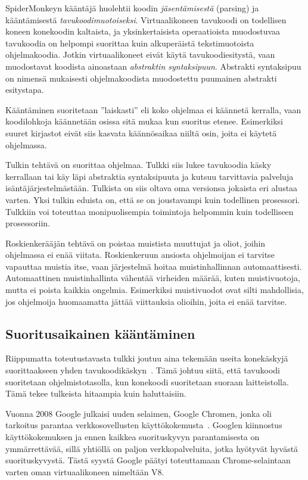 SpiderMonkeyn kääntäjä huolehtii koodin \textit{jäsentämisestä} (parsing) ja kääntämisestä \textit{tavukoodimuotoiseksi}. Virtuaalikoneen tavukoodi on todellisen koneen konekoodin kaltaista, ja yksinkertaisista operaatioista muodostuvaa tavukoodia on helpompi suorittaa kuin alkuperäistä tekstimuotoista ohjelmakoodia. Jotkin virtuaalikoneet eivät käytä tavukoodiesitystä, vaan muodostavat koodista ainoastaan \textit{abstraktin syntaksipuun}. Abstrakti syntaksipuu on nimensä mukaisesti ohjelmakoodista muodostettu puumainen abstrakti esitystapa.

Kääntäminen suoritetaan ''laiskasti'' eli koko ohjelmaa ei käännetä kerralla, vaan koodilohkoja käännetään osissa sitä mukaa kun suoritus etenee. Esimerkiksi suuret kirjastot eivät siis kasvata käännösaikaa niiltä osin, joita ei käytetä ohjelmassa.

Tulkin tehtävä on suorittaa ohjelmaa. Tulkki siis lukee tavukoodia käsky kerrallaan tai käy läpi abstraktia syntaksipuuta ja kutsuu tarvittavia palveluja isäntäjärjestelmästään. Tulkista on siis oltava oma versionsa jokaista eri alustaa varten. Yksi tulkin eduista on, että se on joustavampi kuin todellinen prosessori. Tulkkiin voi toteuttaa monipuolisempia toimintoja helpommin kuin todelliseen prosessoriin.

Roskienkerääjän tehtävä on poistaa muistista muuttujat ja oliot, joihin ohjelmassa ei enää viitata. Roskienkeruun ansiosta ohjelmoijan ei tarvitse vapauttaa muistia itse, vaan järjestelmä hoitaa muistinhallinnan automaattisesti. Automaattinen muistinhallinta vähentää virheiden määrää, kuten muistivuotoja, mutta ei poista kaikkia ongelmia. Esimerkiksi muistivuodot ovat silti mahdollisia, jos ohjelmoija huomaamatta jättää viittauksia olioihin, joita ei enää tarvitse.

\subsection{Suoritusaikainen kääntäminen}

Riippumatta toteutustavasta tulkki joutuu aina tekemään useita konekäskyjä suorittaakseen yhden tavukoodikäskyn~\cite[s.~35]{vms}. Tämä johtuu siitä, että tavukoodi suoritetaan ohjelmistotasolla, kun konekoodi suoritetaan suoraan laitteistolla. Tämä tekee tulkeista hitaampia kuin haluttaisiin.

Vuonna 2008 Google julkaisi uuden selaimen, Google Chromen, jonka oli tarkoitus parantaa verkkosovellusten käyttökokemusta~\cite{chromepress}. Googlen kiinnostus käyttökokemuksen ja ennen kaikkea suorituskyvyn parantamisesta on ymmärrettävää, sillä yhtiöllä on paljon verkkopalveluita, jotka hyötyvät hyvästä suorituskyvystä. Tästä syystä Google päätyi toteuttamaan Chrome-selaintaan varten oman virtuaalikoneen nimeltään V8.

